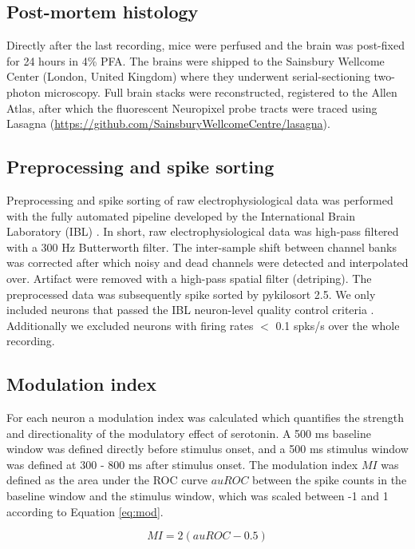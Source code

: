 \documentclass[11pt,a4paper,onecolumn]{article}
\begin{document}
\subsection*{Post-mortem histology}
Directly after the last recording, mice were perfused and the brain was post-fixed for 24 hours in 4\% PFA. The brains were shipped to the Sainsbury Wellcome Center (London, United Kingdom) where they underwent serial-sectioning two-photon microscopy. Full brain stacks were reconstructed, registered to the Allen Atlas, after which the fluorescent Neuropixel probe tracts were traced using Lasagna (\url{https://github.com/SainsburyWellcomeCentre/lasagna}).

\subsection*{Preprocessing and spike sorting}
Preprocessing and spike sorting of raw electrophysiological data was performed with the fully automated pipeline developed by the International Brain Laboratory (IBL) \citep{international_brain_laboratory_spike_2022}. In short, raw electrophysiological data was high-pass filtered with a 300 Hz Butterworth filter. The inter-sample shift between channel banks was corrected after which noisy and dead channels were detected and interpolated over. Artifact were removed with a high-pass spatial filter (detriping). The preprocessed data was subsequently spike sorted by pykilosort 2.5. We only included neurons that passed the IBL neuron-level quality control criteria \citep{international_brain_laboratory_spike_2022}. Additionally we excluded neurons with firing rates $<$ 0.1 spks/s over the whole recording. 

\subsection*{Modulation index}
For each neuron a modulation index was calculated which quantifies the strength and directionality of the modulatory effect of serotonin. A 500 ms baseline window was defined directly before stimulus onset, and a 500 ms stimulus window was defined at 300 - 800 ms after stimulus onset. The modulation index $MI$ was defined as the area under the ROC curve $auROC$ between the spike counts in the baseline window and the stimulus window, which was scaled between -1 and 1 according to Equation \ref{eq:mod}.

\begin{equation}\label{eq:mod}
	MI = 2(auROC - 0.5)
\end{equation}
\end{document}
